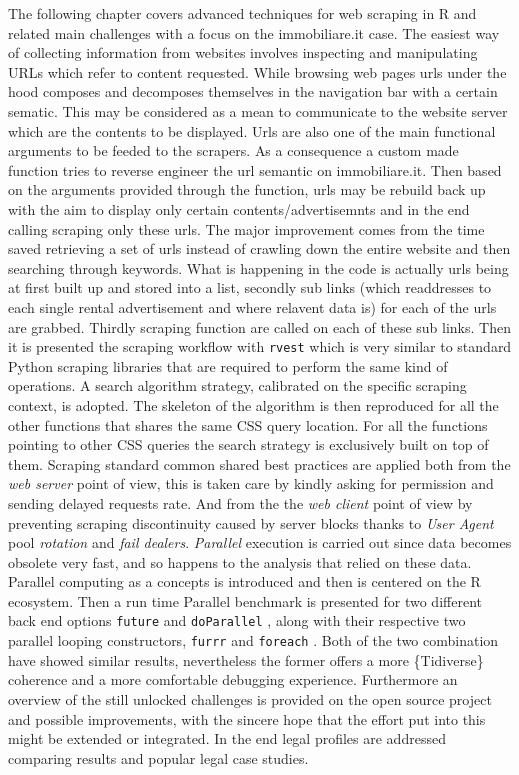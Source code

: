\documentclass[
  12pt,
  a4paper,
  oneside]{book}
\theoremstyle{definition}
\theoremstyle{definition}
\theoremstyle{definition}
\theoremstyle{remark}
\begin{document}
The following chapter covers advanced techniques for web scraping in R and related main challenges with a focus on the immobiliare.it case. The easiest way of collecting information from websites involves inspecting and manipulating URLs which refer to content requested. While browsing web pages urls under the hood composes and decomposes themselves in the navigation bar with a certain sematic. This may be considered as a mean to communicate to the website server which are the contents to be displayed. Urls are also one of the main functional arguments to be feeded to the scrapers. As a consequence a custom made function tries to reverse engineer the url semantic on immobiliare.it. Then based on the arguments provided through the function, urls may be rebuild back up with the aim to display only certain contents/advertisemnts and in the end calling scraping only these urls.
The major improvement comes from the time saved retrieving a set of urls instead of crawling down the entire website and then searching through keywords. What is happening in the code is actually urls being at first built up and stored into a list, secondly sub links (which readdresses to each single rental advertisement and where relavent data is) for each of the urls are grabbed. Thirdly scraping function are called on each of these sub links.
Then it is presented the scraping workflow with \texttt{rvest} \citet{rvest} which is very similar to standard Python scraping libraries that are required to perform the same kind of operations. A search algorithm strategy, calibrated on the specific scraping context, is adopted. The skeleton of the algorithm is then reproduced for all the other functions that shares the same CSS query location. For all the functions pointing to other CSS queries the search strategy is exclusively built on top of them.
Scraping standard common shared best practices are applied both from the \emph{web server} point of view, this is taken care by kindly asking for permission and sending delayed requests rate. And from the the \emph{web client} point of view by preventing scraping discontinuity caused by server blocks thanks to \emph{User Agent} pool \emph{rotation} and \emph{fail dealers}.
\emph{Parallel} execution is carried out since data becomes obsolete very fast, and so happens to the analysis that relied on these data. Parallel computing as a concepts is introduced and then is centered on the R ecosystem. Then a run time Parallel benchmark is presented for two different back end options \texttt{future} \citet{future} and \texttt{doParallel} \citet{doParallel}, along with their respective two parallel looping constructors, \texttt{furrr} \citet{furrr} and \texttt{foreach} \citet{foreach}. Both of the two combination have showed similar results, nevertheless the former offers a more \{Tidiverse\} coherence and a more comfortable debugging experience. Furthermore an overview of the still unlocked challenges is provided on the open source project and possible improvements, with the sincere hope that the effort put into this might be extended or integrated. In the end legal profiles are addressed comparing results and popular legal case studies.
\end{document}
